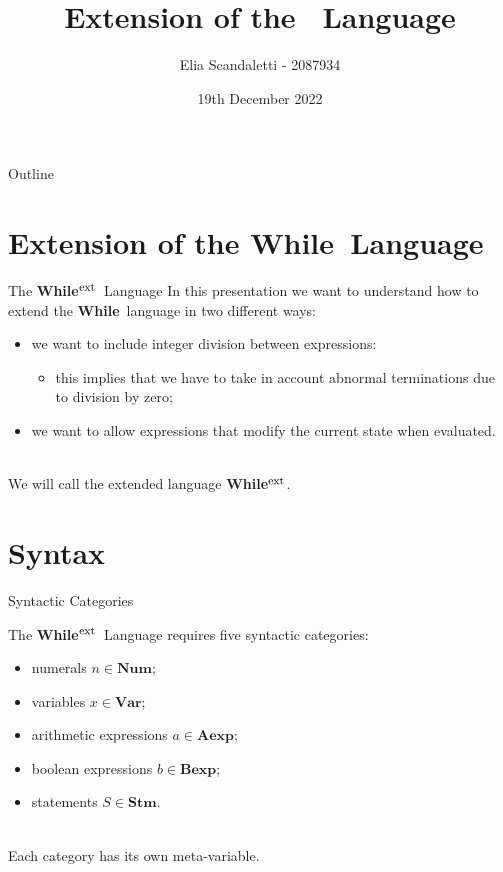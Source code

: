 \documentclass{beamer}
\title{Extension of the \While\ Language}
\author[E. Scandaletti]{Elia Scandaletti - 2087934}
\date[19/12/2022]{19th December 2022}
\newcommand{\While}{\textbf{While}}
\newcommand{\ExtWhile}{\textbf{While}\ensuremath{^{\mbox{\footnotesize ext}}}}
\newcommand{\Num}{\textbf{Num}}
\newcommand{\Var}{\textbf{Var}}
\newcommand{\Aexp}{\textbf{Aexp}}
\newcommand{\Bexp}{\textbf{Bexp}}
\newcommand{\Stm}{\textbf{Stm}}
\begin{document}
\begin{frame}
    \titlepage
\end{frame}

\begin{frame}{Outline}
    \tableofcontents
\end{frame}

\section{Extension of the \While\ Language}

\begin{frame}{The \ExtWhile\ Language}
    In this presentation we want to understand how to extend the \While\ language in two different ways:
    \begin{itemize}
        \item we want to include integer division between expressions:
              \begin{itemize}
                  \item this implies that we have to take in account abnormal terminations due to \alert{division by zero};
              \end{itemize}
        \item we want to allow expressions that \alert{modify the current state} when evaluated.
    \end{itemize}

    ~\\
    We will call the extended language \ExtWhile.

\end{frame}

\section{Syntax}

\begin{frame}{Syntactic Categories}

    The \ExtWhile\ Language requires five syntactic categories:
    \begin{itemize}
        \item numerals $n \in \Num$;
        \item variables $x \in \Var$;
        \item arithmetic expressions $a \in \Aexp$;
        \item boolean expressions $b \in \Bexp$;
        \item statements $S \in \Stm$.
    \end{itemize}

    ~\\
    Each category has its own meta-variable.

\end{frame}
\end{document}
